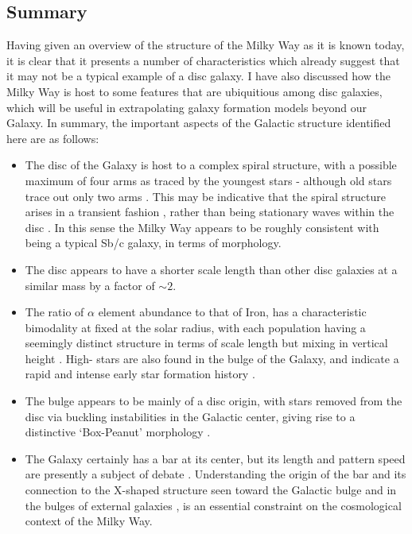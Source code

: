 \subsection{Summary}
Having given an overview of the structure of the Milky Way as it is known today, it is clear that it presents a number of characteristics which already suggest that it may not be a typical example of a disc galaxy. I have also discussed how the Milky Way is host to some features that are ubiquitious among disc galaxies, which will be useful in extrapolating galaxy formation models beyond our Galaxy. In summary, the important aspects of the Galactic structure identified here are as follows:
\begin{itemize}
    \item The disc of the Galaxy is host to a complex spiral structure, with a possible maximum of four arms as traced by the youngest stars \citep[e.g.][]{2014MNRAS.437.1791U} - although old stars trace out only two arms \citep[e.g.][]{2000A&A...358L..13D}. This may be indicative that the spiral structure arises in a transient fashion \citep[e.g.][]{2011MNRAS.410.1637S}, rather than being stationary waves within the disc \citep[e.g.][]{1964ApJ...140..646L}. In this sense the Milky Way appears to be roughly consistent with being a typical Sb/c galaxy, in terms of morphology.
    \item The disc appears to have a shorter scale length than other disc galaxies at a similar mass \citep[e.g.][]{2010MNRAS.406.1595F} by a factor of $\sim 2$.
    \item The ratio of $\alpha$ element abundance to that of Iron, \afe{} has a characteristic bimodality at fixed \feh{} at the solar radius, with each population having a seemingly distinct structure in terms of scale length but mixing in vertical height \citep[e.g.][]{2012ApJ...751..131B,2012ApJ...753..148B,2016ApJ...823...30B}. High-\afe{} stars are also found in the bulge of the Galaxy, and indicate a rapid and intense early star formation history \citep[e.g.][]{2017arXiv170202971B}.
    \item The bulge appears to be mainly of a disc origin, with stars removed from the disc via buckling instabilities in the Galactic center, giving rise to a distinctive `Box-Peanut' morphology \citep[e.g.][]{2005MNRAS.358.1477A}.
    \item The Galaxy certainly has a bar at its center, but its length and pattern speed are presently a subject of debate \citep[e.g.][]{2000AJ....119..800D,2015MNRAS.450.4050W}. Understanding the origin of the bar and its connection to the X-shaped structure seen toward the Galactic bulge \citep[e.g.][]{2016AJ....152...14N} and in the bulges of external galaxies \citep{2006MNRAS.370..753B}, is an essential constraint on the cosmological context of the Milky Way.

\end{itemize}
